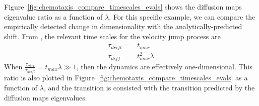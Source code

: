 \documentclass[preprint]{elsarticle}
\begin{document}
Figure~\ref{fig:chemotaxis_compare_timescales_evals} shows the diffusion maps eigenvalue ratio as a function of $\lambda$. 
%
For this specific example, we can compare the empirically detected change in dimensionality with the analytically-predicted shift. 
%
From \cite{othmer2000diffusion}, the relevant time scales for the velocity jump process are
%
\begin{equation}
\begin{aligned}
\tau_{drift} =& t_{max} \\
\tau_{diff} =& t_{max}^2 \lambda
\end{aligned}
\end{equation}
%
When $\frac{\tau_{diff}}{\tau_{drift}} =  t_{max}  \lambda \gg 1$, then the dynamics are effectively one-dimensional. 
%
This ratio is also plotted in Figure~\ref{fig:chemotaxis_compare_timescales_evals} as a function of $\lambda$, and the transition is consisted with the transition predicted by the diffusion maps eigenvalues. 
\end{document}
